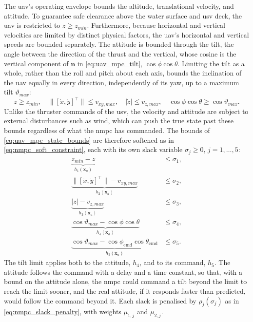 The \gls{uav}'s operating envelope bounds the altitude, translational velocity, and attitude. To guarantee safe clearance above the water surface and \gls{usv} deck, the \gls{uav} is restricted to $z \ge z_{min}$. Furthermore, because horizontal and vertical velocities are limited by distinct physical factors, the \gls{uav}'s horizontal and vertical speeds are bounded separately. The attitude is bounded through the tilt, the angle between the direction of the thrust and the vertical, whose cosine is the vertical component of $\mathbf{n}$ in \eqref{eq:uav_mpc_tilt}, $\cos\phi\cos\theta$. Limiting the tilt as a whole, rather than the roll and pitch about each axis, bounds the inclination of the \gls{uav} equally in every direction, independently of its yaw, up to a maximum tilt $\vartheta_{max}$:
\begin{equation}
    z \ge z_{min}, \quad \big\|[\dot x,\dot y]^\top\big\| \le v_{xy,max}, \quad |\dot z| \le v_{z,max}, \quad \cos\phi\cos\theta \ge \cos\vartheta_{max}.
    \label{eq:uav_mpc_state_bounds}
\end{equation}
Unlike the thruster commands of the \gls{usv}, the velocity and attitude are subject to external disturbances such as wind, which can push the true state past these bounds regardless of what the \gls{nmpc} has commanded. The bounds of \eqref{eq:uav_mpc_state_bounds} are therefore softened as in \eqref{eq:nmpc_soft_constraint}, each with its own slack variable $\sigma_j \ge 0$, $j=1,\dots,5$:
\begin{align}
    \underbrace{z_{min} - z}_{h_1(\mathbf{x}_a)} &\le \sigma_1, \label{eq:uav_mpc_slack_z} \\
    \underbrace{\big\|[\dot x,\dot y]^\top\big\| - v_{xy,max}}_{h_2(\mathbf{x}_a)} &\le \sigma_2, \label{eq:uav_mpc_slack_vxy} \\
    \underbrace{|\dot z| - v_{z,max}}_{h_3(\mathbf{x}_a)} &\le \sigma_3, \label{eq:uav_mpc_slack_vz} \\
    \underbrace{\cos\vartheta_{max} - \cos\phi\cos\theta}_{h_4(\mathbf{x}_a)} &\le \sigma_4, \label{eq:uav_mpc_slack_tilt} \\
    \underbrace{\cos\vartheta_{max} - \cos\phi_{\mathrm{cmd}}\cos\theta_{\mathrm{cmd}}}_{h_5(\mathbf{x}_a)} &\le \sigma_5. \label{eq:uav_mpc_slack_tilt_cmd}
\end{align}
The tilt limit applies both to the attitude, $h_4$, and to its command, $h_5$. The attitude follows the command with a delay and a time constant, so that, with a bound on the attitude alone, the \gls{nmpc} could command a tilt beyond the limit to reach the limit sooner, and the real attitude, if it responds faster than predicted, would follow the command beyond it. Each slack is penalised by $\rho_j(\sigma_j)$ as in \eqref{eq:nmpc_slack_penalty}, with weights $\mu_{1,j}$ and $\mu_{2,j}$.


